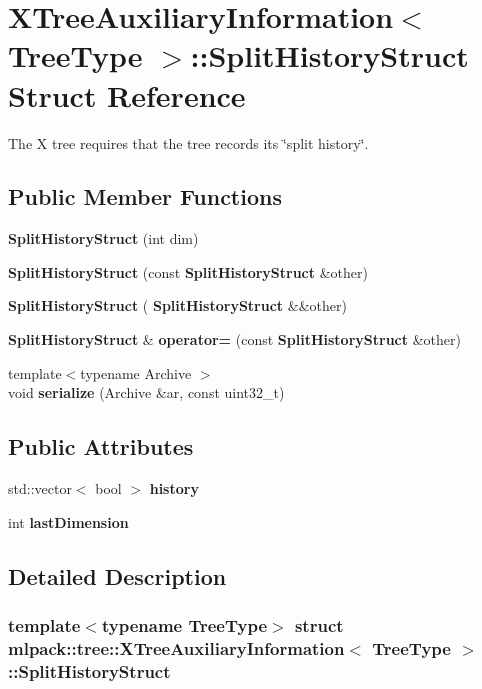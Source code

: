 \section{X\+Tree\+Auxiliary\+Information$<$ Tree\+Type $>$\+:\+:Split\+History\+Struct Struct Reference}
\label{structmlpack_1_1tree_1_1XTreeAuxiliaryInformation_1_1SplitHistoryStruct}


The X tree requires that the tree records it\textquotesingle{}s \char`\"{}split history\char`\"{}.  


\subsection*{Public Member Functions}
\begin{DoxyCompactItemize}
\item 
\textbf{ Split\+History\+Struct} (int dim)
\item 
\textbf{ Split\+History\+Struct} (const \textbf{ Split\+History\+Struct} \&other)
\item 
\textbf{ Split\+History\+Struct} (\textbf{ Split\+History\+Struct} \&\&other)
\item 
\textbf{ Split\+History\+Struct} \& \textbf{ operator=} (const \textbf{ Split\+History\+Struct} \&other)
\item 
{\footnotesize template$<$typename Archive $>$ }\\void \textbf{ serialize} (Archive \&ar, const uint32\+\_\+t)
\end{DoxyCompactItemize}
\subsection*{Public Attributes}
\begin{DoxyCompactItemize}
\item 
std\+::vector$<$ bool $>$ \textbf{ history}
\item 
int \textbf{ last\+Dimension}
\end{DoxyCompactItemize}


\subsection{Detailed Description}
\subsubsection*{template$<$typename Tree\+Type$>$\newline
struct mlpack\+::tree\+::\+X\+Tree\+Auxiliary\+Information$<$ Tree\+Type $>$\+::\+Split\+History\+Struct}

